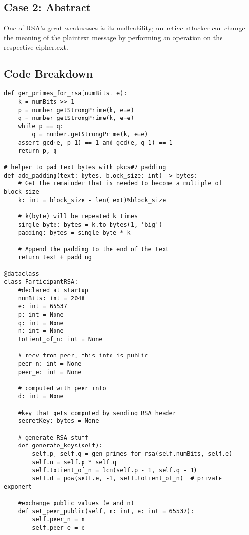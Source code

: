 \documentclass[11pt]{article}
\begin{document}
\subsection*{Case 2: Abstract}
One of RSA’s great weaknesses is its malleability; an active attacker can change the meaning of the plaintext message by performing an operation on the respective ciphertext.

\subsection*{Code Breakdown}

\begin{lstlisting}
def gen_primes_for_rsa(numBits, e):
    k = numBits >> 1
    p = number.getStrongPrime(k, e=e)
    q = number.getStrongPrime(k, e=e)
    while p == q:
        q = number.getStrongPrime(k, e=e)
    assert gcd(e, p-1) == 1 and gcd(e, q-1) == 1
    return p, q

# helper to pad text bytes with pkcs#7 padding
def add_padding(text: bytes, block_size: int) -> bytes:
    # Get the remainder that is needed to become a multiple of block_size
    k: int = block_size - len(text)%block_size

    # k(byte) will be repeated k times
    single_byte: bytes = k.to_bytes(1, 'big')
    padding: bytes = single_byte * k

    # Append the padding to the end of the text 
    return text + padding 

@dataclass
class ParticipantRSA:
    #declared at startup
    numBits: int = 2048
    e: int = 65537
    p: int = None
    q: int = None
    n: int = None
    totient_of_n: int = None

    # recv from peer, this info is public
    peer_n: int = None
    peer_e: int = None

    # computed with peer info
    d: int = None

    #key that gets computed by sending RSA header
    secretKey: bytes = None

    # generate RSA stuff
    def generate_keys(self): 
        self.p, self.q = gen_primes_for_rsa(self.numBits, self.e)
        self.n = self.p * self.q
        self.totient_of_n = lcm(self.p - 1, self.q - 1)
        self.d = pow(self.e, -1, self.totient_of_n)  # private exponent
    
    #exchange public values (e and n)
    def set_peer_public(self, n: int, e: int = 65537):
        self.peer_n = n
        self.peer_e = e


\end{lstlisting}
\end{document}
